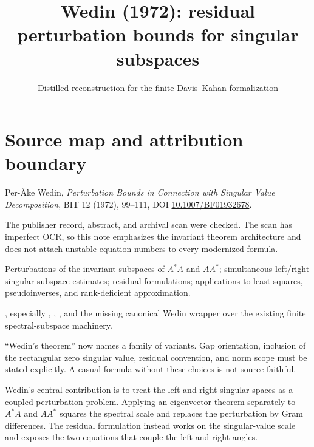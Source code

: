 
\title{Wedin (1972): residual perturbation bounds for singular subspaces}
\author{}
\date{Distilled reconstruction for the finite Davis--Kahan formalization}

\maketitle

\section*{Source map and attribution boundary}
\begin{sourceguide}
\item[Primary source] Per-\AA ke Wedin, \emph{Perturbation Bounds in Connection with Singular Value Decomposition}, BIT 12 (1972), 99--111, DOI \href{https://doi.org/10.1007/BF01932678}{10.1007/BF01932678}.
\item[Source access] The publisher record, abstract, and archival scan were checked. The scan has imperfect OCR, so this note emphasizes the invariant theorem architecture and does not attach unstable equation numbers to every modernized formula.
\item[Paper scope] Perturbations of the invariant subspaces of $A^*A$ and $AA^*$; simultaneous left/right singular-subspace estimates; residual formulations; applications to least squares, pseudoinverses, and rank-deficient approximation.
\item[Formalization target] , especially , , , and the missing canonical Wedin wrapper over the existing finite spectral-subspace machinery.
\item[Warning] ``Wedin's theorem'' now names a family of variants. Gap orientation, inclusion of the rectangular zero singular value, residual convention, and norm scope must be stated explicitly. A casual formula without these choices is not source-faithful.
\end{sourceguide}

Wedin's central contribution is to treat the left and right singular spaces as a coupled perturbation problem. Applying an eigenvector theorem separately to $A^*A$ and $AA^*$ squares the spectral scale and replaces the perturbation by Gram differences. The residual formulation instead works on the singular-value scale and exposes the two equations that couple the left and right angles.

